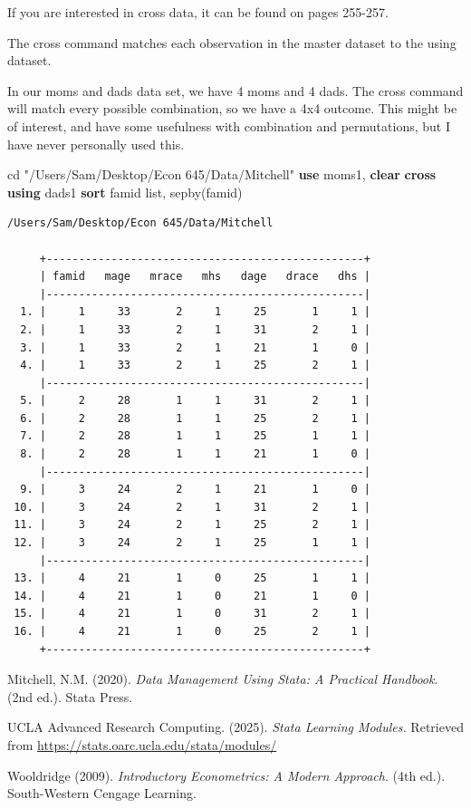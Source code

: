 \documentclass[
]{book}
\newenvironment{Shaded}{\begin{snugshade}}{\end{snugshade}}
\newcommand{\KeywordTok}[1]{\textcolor[rgb]{0.13,0.29,0.53}{\textbf{#1}}}
\newcommand{\NormalTok}[1]{#1}
\newcommand{\OtherTok}[1]{\textcolor[rgb]{0.56,0.35,0.01}{#1}}
\newcommand{\StringTok}[1]{\textcolor[rgb]{0.31,0.60,0.02}{#1}}
\begin{document}
If you are interested in cross data, it can be found on pages 255-257.

The cross command matches each observation in the master dataset to the using dataset.

In our moms and dads data set, we have 4 moms and 4 dads. The cross command will match every possible combination, so we have a 4x4 outcome. This might be of interest, and have some usefulness with combination and permutations, but I have never personally used this.

\begin{Shaded}
\begin{Highlighting}[]
\NormalTok{cd }\StringTok{"/Users/Sam/Desktop/Econ 645/Data/Mitchell"}
\KeywordTok{use}\NormalTok{ moms1, }\KeywordTok{clear}
\KeywordTok{cross} \KeywordTok{using}\NormalTok{ dads1}
\KeywordTok{sort}\NormalTok{ famid}
\OtherTok{list}\NormalTok{, sepby(famid)}
\end{Highlighting}
\end{Shaded}

\begin{verbatim}
/Users/Sam/Desktop/Econ 645/Data/Mitchell

     +-------------------------------------------------+
     | famid   mage   mrace   mhs   dage   drace   dhs |
     |-------------------------------------------------|
  1. |     1     33       2     1     25       1     1 |
  2. |     1     33       2     1     31       2     1 |
  3. |     1     33       2     1     21       1     0 |
  4. |     1     33       2     1     25       2     1 |
     |-------------------------------------------------|
  5. |     2     28       1     1     31       2     1 |
  6. |     2     28       1     1     25       2     1 |
  7. |     2     28       1     1     25       1     1 |
  8. |     2     28       1     1     21       1     0 |
     |-------------------------------------------------|
  9. |     3     24       2     1     21       1     0 |
 10. |     3     24       2     1     31       2     1 |
 11. |     3     24       2     1     25       2     1 |
 12. |     3     24       2     1     25       1     1 |
     |-------------------------------------------------|
 13. |     4     21       1     0     25       1     1 |
 14. |     4     21       1     0     21       1     0 |
 15. |     4     21       1     0     31       2     1 |
 16. |     4     21       1     0     25       2     1 |
     +-------------------------------------------------+
\end{verbatim}

Mitchell, N.M. (2020). \emph{Data Management Using Stata: A Practical Handbook}. (2nd ed.). Stata Press.

UCLA Advanced Research Computing. (2025). \emph{Stata Learning Modules.} Retrieved from \url{https://stats.oarc.ucla.edu/stata/modules/}

Wooldridge (2009). \emph{Introductory Econometrics: A Modern Approach}. (4th ed.). South-Western Cengage Learning.


\end{document}
